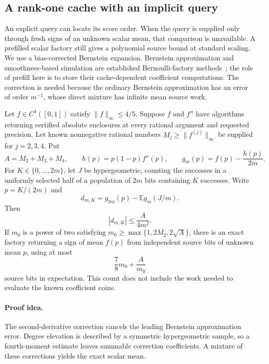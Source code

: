\subsection{A rank-one cache with an implicit query}
\label{sec:implicitrankone}

An explicit query can locate its score order.  When the query is supplied
only through fresh signs of an unknown scalar mean, that comparison is
unavailable.  A prefilled scalar factory still gives a polynomial source
bound at standard scaling.  We use a bias-corrected Bernstein expansion.
Bernstein approximation and smoothness-based simulation are established
Bernoulli-factory methods~\cite{nacuperes2005,holtz2011}; the role of
prefill here is to store their cache-dependent coefficient computations.
The correction is needed because the ordinary Bernstein approximation
has an error of order $m^{-1}$, whose direct mixture has infinite mean
source work.

\begin{lemma}
\label{lem:correctedbernstein}
Let $f\in C^4([0,1])$ satisfy $\|f\|_\infty\le4/5$.
Suppose $f$ and $f''$ have algorithms returning certified absolute
enclosures at every rational argument and requested precision.
Let known nonnegative rational numbers
$M_j\ge\|f^{(j)}\|_\infty$ be supplied for $j=2,3,4$.  Put
\[
 A=M_2+M_3+M_4,\qquad h(p)=p(1-p)f''(p),\qquad
 g_m(p)=f(p)-\frac{h(p)}{2m}.
\]
For $K\in\{0,\ldots,2m\}$, let $J$ be hypergeometric, counting
the successes in a uniformly selected half of a population of $2m$
bits containing $K$ successes.  Write $p=K/(2m)$ and
\[
 d_{m,K}=g_{2m}(p)-\mathbb E g_m(J/m).
\]
Then
\begin{equation}
 |d_{m,K}|\le\frac{A}{4m^2}.
 \label{eq:correctedcoefficientbound}
\end{equation}
If $m_0$ is a power of two satisfying
$m_0\ge\max\{1,2M_2,2\sqrt A\}$, there is an exact factory
returning a sign of mean $f(p)$ from independent source bits of
unknown mean $p$, using at most
\begin{equation}
 \frac78m_0+\frac{A}{m_0}
 \label{eq:correctedsourcecost}
\end{equation}
source bits in expectation.  This count does not include the work
needed to evaluate the known coefficient coins.
\end{lemma}

\paragraph{Proof idea.}
The second-derivative correction cancels the leading Bernstein approximation error.  Degree elevation is described by a symmetric hypergeometric sample, so a fourth-moment estimate leaves summable correction coefficients.  A mixture of these corrections yields the exact scalar mean.

